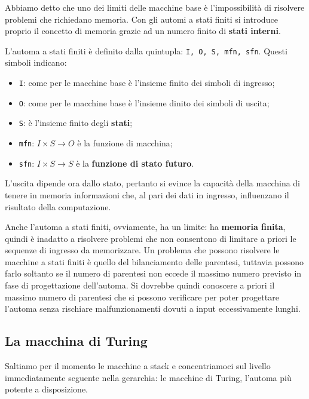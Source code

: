 \documentclass[11pt]{book}
\begin{document}
Abbiamo detto che uno dei limiti delle macchine base \`e
l'impossibilit\`a di risolvere problemi che richiedano memoria. Con
gli automi a stati finiti si introduce proprio il concetto di memoria
grazie ad un numero finito di \textbf{stati interni}.

L'automa a stati finiti \`e definito dalla quintupla: \texttt{I, O, S,
  mfn, sfn}. Questi simboli indicano:

\begin{itemize}
\item \texttt{I}: come per le macchine base \`e l'insieme finito dei
  simboli di ingresso;
\item \texttt{O}: come per le macchine base \`e l'insieme dinito dei
  simboli di uscita;
\item \texttt{S}: \`e l'insieme finito degli \textbf{stati};
\item \texttt{mfn}: $I \times S \rightarrow O$ \`e la funzione di
  macchina;
\item \texttt{sfn}: $I \times S \rightarrow S$ \`e la \textbf{funzione
    di stato futuro}.
\end{itemize}


L'uscita dipende ora dallo stato, pertanto si evince la capacit\`a
della macchina di tenere in memoria informazioni che, al pari dei dati
in ingresso, influenzano il risultato della computazione.

Anche l'automa a stati finiti, ovviamente, ha un limite: ha
\textbf{memoria finita}, quindi \`e inadatto a risolvere problemi che
non consentono di limitare a priori le sequenze di ingresso da
memorizzare. Un problema che possono risolvere le macchine a stati
finiti \`e quello del bilanciamento delle parentesi, tuttavia possono
farlo soltanto se il numero di parentesi non eccede il massimo numero
previsto in fase di progettazione dell'automa. Si dovrebbe quindi
conoscere a priori il massimo numero di parentesi che si possono
verificare per poter progettare l'automa senza rischiare
malfunzionamenti dovuti a input eccessivamente lunghi.


\subsection{La macchina di Turing}

Saltiamo per il momento le macchine a stack e concentriamoci sul
livello immediatamente seguente nella gerarchia: le macchine di
Turing, l'automa pi\`u potente a disposizione.
\end{document}
